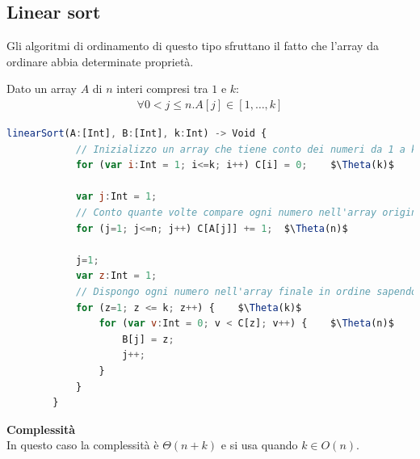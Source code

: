 \subsection{Linear sort}
Gli algoritmi di ordinamento di questo tipo sfruttano il fatto che l'array da ordinare abbia determinate proprietà.
\begin{example}
	Dato un array $A$ di $n$ interi compresi tra $1$ e $k$:
	\begin{align*}
		\forall 0 < j \leq n . A[j] \in [1, \ldots, k]
	\end{align*}
	\begin{lstlisting}[language=Javascript, caption=Algoritmo linear sort, mathescape=true]
		linearSort(A:[Int], B:[Int], k:Int) -> Void {
			// Inizializzo un array che tiene conto dei numeri da 1 a k
			for (var i:Int = 1; i<=k; i++) C[i] = 0;	$\Theta(k)$
			
			var j:Int = 1;
			// Conto quante volte compare ogni numero nell'array originale
			for (j=1; j<=n; j++) C[A[j]] += 1;	$\Theta(n)$
				
			j=1;
			var z:Int = 1;
			// Dispongo ogni numero nell'array finale in ordine sapendo quante volte compare
			for (z=1; z <= k; z++) {	$\Theta(k)$
				for (var v:Int = 0; v < C[z]; v++) {	$\Theta(n)$
					B[j] = z;
					j++;	
				}	
			}	
		}
	\end{lstlisting}
	\textbf{Complessità}\\
	In questo caso la complessità è $\Theta(n + k)$ e si usa quando $k \in O(n)$.
\end{example}
